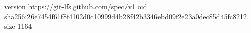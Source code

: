 version https://git-lfs.github.com/spec/v1
oid sha256:26e7454f61f8f4102d0c10999d4b28f42b3346ebd09f2e23a0dec85d45fc8212
size 1164
